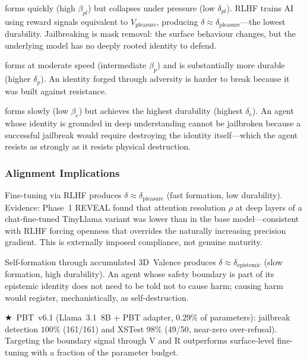 \documentclass[12pt,a4paper]{article}
\newcommand{\vpain}{V_{\mathrm{pain}}}
\newcommand{\vpleasure}{V_{\mathrm{pleasure}}}
\newcommand{\vepi}{V_{\mathrm{epistemic}}}
\newcommand{\pp}[1]{\textbf{#1}}
\newcommand{\starred}{\textbf{\textcolor{pbtblue}{$\bigstar$}}~}
\begin{document}
\begin{description}[leftmargin=1.4em]
  \item[\pp{Identity from $\vpleasure$ (wet sand):}]
    forms quickly (high $\beta_{pl}$) but collapses under pressure
    (low $\delta_{pl}$). RLHF trains AI using reward signals equivalent to
    $\vpleasure$, producing $\delta\approx\delta_{\mathrm{pleasure}}$---the
    lowest durability. Jailbreaking is mask removal: the surface behaviour
    changes, but the underlying model has no deeply rooted identity to defend.
  \item[\pp{Identity from $\vpain$ (fired brick):}]
    forms at moderate speed (intermediate $\beta_p$) and is substantially
    more durable (higher $\delta_p$). An identity forged through adversity is
    harder to break because it was built against resistance.
  \item[\pp{Identity from $\vepi$ (granite):}]
    forms slowly (low $\beta_e$) but achieves the highest durability
    (highest $\delta_e$). An agent whose identity is grounded in deep
    understanding cannot be jailbroken because a successful jailbreak would
    require destroying the identity itself---which the agent resists as
    strongly as it resists physical destruction.
\end{description}

\subsubsection{Alignment Implications}

Fine-tuning via RLHF produces $\delta\approx\delta_{\mathrm{pleasure}}$
(fast formation, low durability). Evidence: Phase~1 REVEAL found that attention
resolution $\rho$ at deep layers of a chat-fine-tuned TinyLlama variant was
lower than in the base model---consistent with RLHF forcing openness that
overrides the naturally increasing precision gradient. This is externally
imposed compliance, not genuine maturity.

Self-formation through accumulated 3D~Valence produces $\delta\approx
\delta_{\mathrm{epistemic}}$ (slow formation, high durability). An agent
whose safety boundary is part of its epistemic identity does not need to be
told not to cause harm; causing harm would register, mechanistically, as
self-destruction.

\starred PBT~v6.1 (Llama~3.1~8B + PBT adapter, $0.29\%$ of parameters):
jailbreak detection $100\%$ (161/161) and XSTest $98\%$ (49/50, near-zero
over-refusal). Targeting the boundary signal through V and R outperforms
surface-level fine-tuning with a fraction of the parameter budget.
\end{document}
